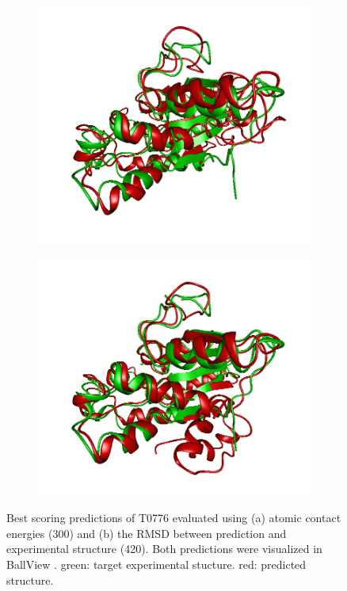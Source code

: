 \documentclass[11pt,a4paper]{article}
\renewcommand{\(}{\left (}
\renewcommand{\)}{\right )}
\begin{document}
\begin{figure}[!h]
	\begin{subfigure}{.5\textwidth}
		\includegraphics[width=\textwidth]{figures/T0776TS300}
		\subcaption{}
	\end{subfigure}
	\begin{subfigure}{.5\textwidth}
		\includegraphics[width=\textwidth]{figures/T0776TS420}
		\subcaption{}
	\end{subfigure}
	 \caption{Best scoring predictions of T0776 evaluated using (a) atomic contact energies (300) and (b) the RMSD between prediction and experimental structure (420). Both predictions were visualized in BallView \citep{ballview}. green: target experimental stucture. red: predicted structure.}
\end{figure}
\end{document}
